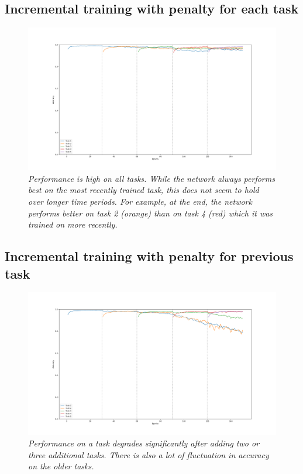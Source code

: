\documentclass{article}
\begin{document}
        \subsection*{Incremental training with penalty for each task}
            \begin{figure}[H]
                \includegraphics[width=\textwidth]{figures/exp1_results.png}
                \caption{\textit{Performance is high on all tasks. While the 
                network always performs best on the most recently trained task,
                this does not seem to hold over longer time periods. For example, 
                at the end, the network performs better on task 2 (orange) than 
                on task 4 (red) which it was trained on more recently.}}
            \end{figure}
        \subsection*{Incremental training with penalty for previous task}
            \begin{figure}[H]
                \includegraphics[width=\textwidth]{figures/exp2_results.png}
                \caption{\textit{Performance on a task degrades significantly 
                after adding two or three additional tasks. There is also 
                a lot of fluctuation in accuracy on the older tasks.}}
            \end{figure}
\end{document}
